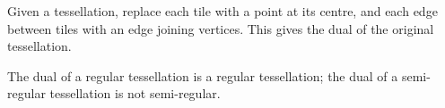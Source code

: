 Given a tessellation, replace each tile with a point at its centre,
and each edge between tiles with an edge joining vertices. This
gives the dual of the original tessellation.
\par
The dual of a regular tessellation is a regular tessellation;
the dual of a semi-regular tessellation is not semi-regular.
